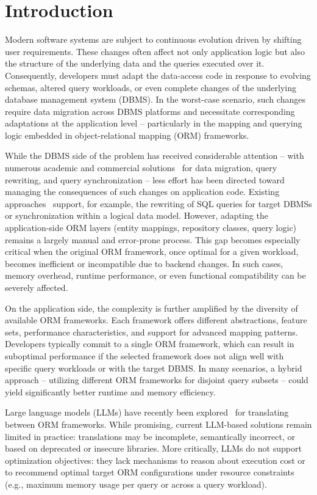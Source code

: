 \chapter*{Introduction}

Modern software systems are subject to continuous evolution driven by shifting user requirements. These changes often affect not only application logic but also the structure of the underlying data and the queries executed over it. Consequently, developers must adapt the data-access code in response to evolving schemas, altered query workloads, or even complete changes of the underlying database management system (DBMS). In the worst-case scenario, such changes require data migration across DBMS platforms and necessitate corresponding adaptations at the application level -- particularly in the mapping and querying logic embedded in object-relational mapping (ORM) frameworks.

While the DBMS side of the problem has received considerable attention -- with numerous academic and commercial solutions~\cite{TODO} for data migration, query rewriting, and query synchronization -- less effort has been directed toward managing the consequences of such changes on application code. Existing approaches~\cite{TODO} support, for example, the rewriting of SQL queries for target DBMSs or synchronization within a logical data model. However, adapting the application-side ORM layers (entity mappings, repository classes, query logic) remains a largely manual and error-prone process. This gap becomes especially critical when the original ORM framework, once optimal for a given workload, becomes inefficient or incompatible due to backend changes. In such cases, memory overhead, runtime performance, or even functional compatibility can be severely affected.

On the application side, the complexity is further amplified by the diversity of available ORM frameworks. Each framework offers different abstractions, feature sets, performance characteristics, and support for advanced mapping patterns. Developers typically commit to a single ORM framework, which can result in suboptimal performance if the selected framework does not align well with specific query workloads or with the target DBMS. In many scenarios, a hybrid approach -- utilizing different ORM frameworks for disjoint query subsets -- could yield significantly better runtime and memory efficiency.

Large language models (LLMs) have recently been explored~\cite{TODO} for translating between ORM frameworks. While promising, current LLM-based solutions remain limited in practice: translations may be incomplete, semantically incorrect, or based on deprecated or insecure libraries. More critically, LLMs do not support optimization objectives: they lack mechanisms to reason about execution cost or to recommend optimal target ORM configurations under resource constraints (e.g., maximum memory usage per query or across a query workload).

